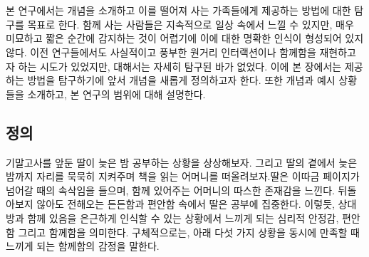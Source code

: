 \chapter{\concept}
\label{sec:concept}



본 연구에서는 \concept{} 개념을 소개하고 이를 떨어져 사는 가족들에게 제공하는 방법에 대한 탐구를 목표로 한다. \concept\은 함께 사는 사람들은 지속적으로 일상 속에서 느낄 수 있지만, 매우 미묘하고 짧은 순간에 감지하는 것이 어렵기에 이에 대한 명확한 인식이 형성되어 있지 않다. 이전 연구들에서도 사실적이고 풍부한 원거리 인터랙션이나 함께함을 재현하고자 하는 시도가 있었지만,  대해서는 자세히 탐구된 바가 없었다. 이에 본 장에서는 \concept\을 제공하는 방법을 탐구하기에 앞서 \concept{} 개념을 새롭게 정의하고자 한다. 또한  개념과 예시 상황들을 소개하고, 본 연구의 범위에 대해 설명한다. 

\section{ 정의}




기말고사를 앞둔 딸이 늦은 밤 공부하는 상황을 상상해보자. 그리고 딸의 곁에서 늦은 밤까지 자리를 묵묵히 지켜주며 책을 읽는 어머니를 떠올려보자.딸은 이따금 페이지가 넘어갈 때의 속삭임을 들으며, 함께 있어주는 어머니의 따스한 존재감을 느낀다. 뒤돌아보지 않아도 전해오는 든든함과 편안함 속에서 딸은 공부에 집중한다.
이렇듯, \concept\은 상대방과 함께 있음을 은근하게 인식할 수 있는 상황에서 느끼게 되는 심리적 안정감, 편안함 그리고 함께함을 의미한다.
구체적으로는, 아래 다섯 가지 상황을 동시에 만족할 때 느끼게 되는 함께함의 감정을 말한다. %


